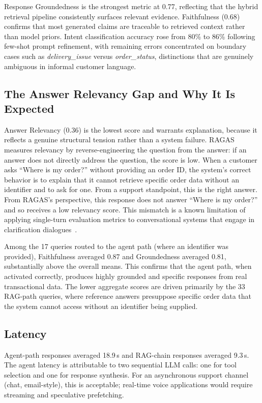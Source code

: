 \documentclass[conference]{IEEEtran}
\begin{document}
Response Groundedness is the strongest metric at 0.77, reflecting that the hybrid
retrieval pipeline consistently surfaces relevant evidence. Faithfulness (0.68)
confirms that most generated claims are traceable to retrieved context rather than
model priors. Intent classification accuracy rose from 80\% to 86\% following
few-shot prompt refinement, with remaining errors concentrated on boundary cases
such as \textit{delivery\_issue} versus \textit{order\_status}, distinctions that
are genuinely ambiguous in informal customer language.

\subsection{The Answer Relevancy Gap and Why It Is Expected}
Answer Relevancy (0.36) is the lowest score and warrants explanation, because it
reflects a genuine structural tension rather than a system failure. RAGAS measures
relevancy by reverse-engineering the question from the answer: if an answer does
not directly address the question, the score is low. When a customer asks ``Where
is my order?'' without providing an order ID, the system's correct behavior is to
explain that it cannot retrieve specific order data without an identifier and to
ask for one. From a support standpoint, this is the right answer. From RAGAS's
perspective, this response does not answer ``Where is my order?'' and so receives
a low relevancy score. This mismatch is a known limitation of applying single-turn
evaluation metrics to conversational systems that engage in clarification
dialogues~\cite{b18}.

Among the 17 queries routed to the agent path (where an identifier was provided),
Faithfulness averaged 0.87 and Groundedness averaged 0.81, substantially above the
overall means. This confirms that the agent path, when activated correctly, produces
highly grounded and specific responses from real transactional data. The lower
aggregate scores are driven primarily by the 33 RAG-path queries, where reference
answers presuppose specific order data that the system cannot access without an
identifier being supplied.

\subsection{Latency}
Agent-path responses averaged 18.9\,s and RAG-chain responses averaged 9.3\,s.
The agent latency is attributable to two sequential LLM calls: one for tool
selection and one for response synthesis. For an asynchronous support channel
(chat, email-style), this is acceptable; real-time voice applications would require
streaming and speculative prefetching.
\end{document}
